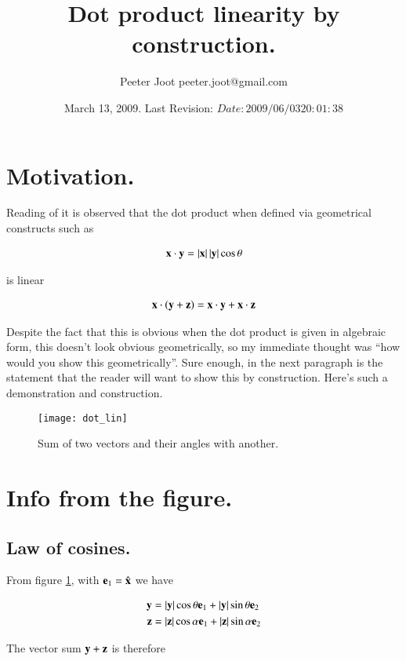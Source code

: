 \documentclass{article}
\title{ Dot product linearity by construction. }
\author{Peeter Joot \quad peeter.joot@gmail.com }
\date{ March 13, 2009.  Last Revision: $Date: 2009/06/03 20:01:38 $ }
\begin{document}
\maketitle{}
\section{Motivation. }

Reading of \cite{byron1992mca} it is observed that the dot product when defined via geometrical constructs such as

\begin{align*}
\mathbf{x} \cdot \mathbf{y} = \left\lvert{\mathbf{x}}\right\rvert \left\lvert{\mathbf{y}}\right\rvert \cos\theta
\end{align*}

is linear

\begin{align*}
\mathbf{x} \cdot (\mathbf{y} + \mathbf{z}) = \mathbf{x} \cdot \mathbf{y} + \mathbf{x} \cdot \mathbf{z} 
\end{align*}

Despite the fact that this is obvious when the dot product is given in algebraic form, this doesn't look obvious geometrically, so my 
immediate thought was ``how would you show this geometrically''.  Sure enough, in the next paragraph is the statement that the reader will
want to show this by construction.  Here's such a demonstration and construction.

\begin{figure}[htp]
\centering
\texttt{[image: dot\_lin]}
\caption{Sum of two vectors and their angles with another.}\label{fig:dot_linearity}
\end{figure}

\section{Info from the figure. }
\subsection{Law of cosines. }

From 
figure \ref{fig:dot_linearity}, with $\mathbf{e}_1 = \hat{\mathbf{x}}$ we have

\begin{align*}
\mathbf{y} &= \left\lvert{\mathbf{y}}\right\rvert \cos\theta \mathbf{e}_1 + \left\lvert{\mathbf{y}}\right\rvert \sin\theta \mathbf{e}_2 \\
\mathbf{z} &= \left\lvert{\mathbf{z}}\right\rvert \cos\alpha \mathbf{e}_1 + \left\lvert{\mathbf{z}}\right\rvert \sin\alpha \mathbf{e}_2
\end{align*}

The vector sum $\mathbf{y} + \mathbf{z}$ is therefore
\end{document}
